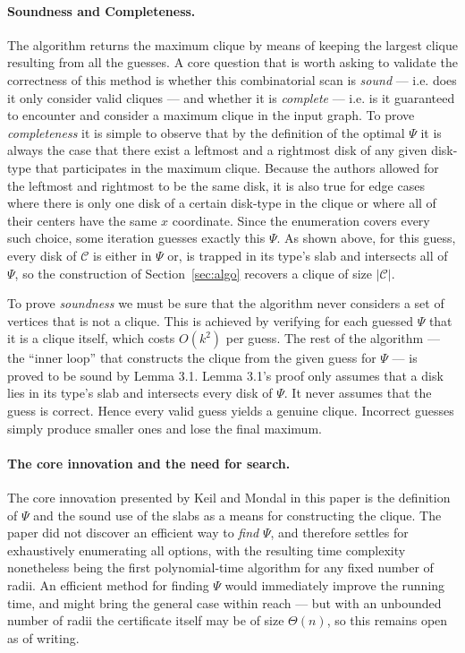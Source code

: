 \documentclass[12pt]{article}
\begin{document}
\paragraph{Soundness and Completeness.}
The algorithm returns the maximum clique by means of keeping the largest clique resulting from all the guesses.
A core question that is worth asking to validate the correctness of this method is whether this combinatorial scan is \textit{sound} --- i.e. does it only consider valid cliques --- and whether it is \textit{complete} --- i.e. is it guaranteed to encounter and consider a maximum clique in the input graph.
To prove \textit{completeness} it is simple to observe that by the definition of the optimal $\Psi$ it is always the case that there exist a leftmost and a rightmost disk of any given disk-type that participates in the maximum clique.
Because the authors allowed for the leftmost and rightmost to be the same disk, it is also true for edge cases where there is only one disk of a certain disk-type in the clique or where all of their centers have the same $x$ coordinate.
Since the enumeration covers every such choice, some iteration guesses exactly this $\Psi$.
As shown above, for this guess, every disk of $\mathcal{C}$ is either in $\Psi$ or, is trapped in its type's slab
and intersects all of $\Psi$, so the construction of Section~\ref{sec:algo} recovers a clique of size $|\mathcal{C}|$.

To prove \textit{soundness} we must be sure that the algorithm never considers a set of vertices that is not a clique. This is achieved by verifying for each guessed $\Psi$ that it is a clique itself, which costs $O(k^2)$ per guess.
The rest of the algorithm --- the ``inner loop'' that constructs the clique from the given guess for $\Psi$ --- is proved to be sound by Lemma 3.1.
Lemma 3.1's proof only assumes that a disk lies in its type's slab and intersects every disk of $\Psi$. It never assumes that the guess is correct.
Hence every valid guess yields a genuine clique.
Incorrect guesses simply produce smaller ones and lose the final maximum.  

\paragraph{The core innovation and the need for search.}
The core innovation presented by Keil and Mondal in this paper is the definition of $\Psi$ and the sound use of the slabs as a means for constructing the clique.
The paper did not discover an efficient way to \textit{find} $\Psi$, and therefore settles for exhaustively enumerating all options,
with the resulting time complexity nonetheless being the first polynomial-time algorithm for any fixed number of radii.
An efficient method for finding $\Psi$ would immediately improve the running time, and might bring the general case within reach --- but with an unbounded number of radii the certificate itself may be of size $\Theta(n)$, so this remains open as of writing.  
\end{document}
